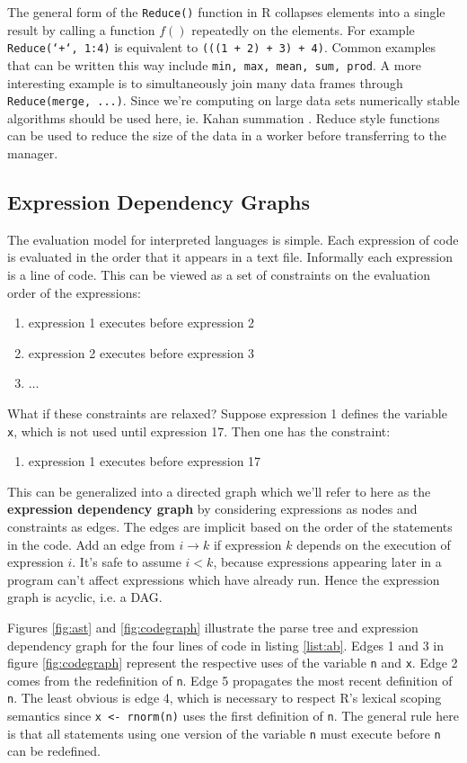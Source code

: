 \documentclass[12pt]{article}
\begin{document}
The general form of the \texttt{Reduce()} function in R collapses elements
into a single result by calling a function $f()$ repeatedly on the
elements. For example \texttt{Reduce(`+`, 1:4)} is equivalent to
\texttt{(((1 + 2) + 3) + 4)}. Common examples that can be written this way
include \texttt{min, max, mean, sum, prod}. A more interesting example is
to simultaneously join many data frames through \texttt{Reduce(merge,
...)}.  Since we're computing on large data sets numerically stable
algorithms should be used here, ie.  Kahan summation \cite{Robey2011217}.
Reduce style functions can be used to reduce the size of the data in a
worker before transferring to the manager.

\subsection{Expression Dependency Graphs}

The evaluation model for interpreted languages is simple. Each
expression of code is evaluated in the order that it appears in a text file. Informally
each expression is a line of code. This can be
viewed as a set of constraints on the evaluation order of the expressions:

\begin{enumerate}
    \item expression 1 executes before expression 2
    \item expression 2 executes before expression 3
    \item $\dots$
\end{enumerate}
What if these constraints are relaxed? Suppose expression 1 defines the variable
\texttt{x}, which is not used until expression 17. Then one has the
constraint:
\begin{enumerate}
    \item expression 1 executes before expression 17
\end{enumerate}
This can be generalized into a directed graph which we'll refer to here as
the \textbf{expression dependency graph} by considering expressions as
nodes and constraints as edges. The edges are implicit based on the order
of the statements in the code. Add an edge from $i \rightarrow k$ if
expression $k$ depends on the execution of expression $i$.  It's safe to
assume $i < k$, because expressions appearing later in a program can't
affect expressions which have already run. Hence the expression graph is
acyclic, i.e. a DAG.

Figures \ref{fig:ast} and \ref{fig:codegraph} illustrate the 
parse tree and expression dependency graph for the four lines of code in
listing \ref{list:ab}.  Edges 1 and 3 in figure \ref{fig:codegraph} represent the
respective uses of the variable \texttt{n} and \texttt{x}.  Edge 2 comes
from the redefinition of \texttt{n}.  Edge 5 propagates the most recent
definition of \texttt{n}.  The least obvious is edge 4, which is necessary
to respect R's lexical scoping semantics since \texttt{x <- rnorm(n)} uses
the first definition of \texttt{n}. The general rule here is that all
statements using one version of the variable \texttt{n} must execute before \texttt{n}
can be redefined.
\end{document}
